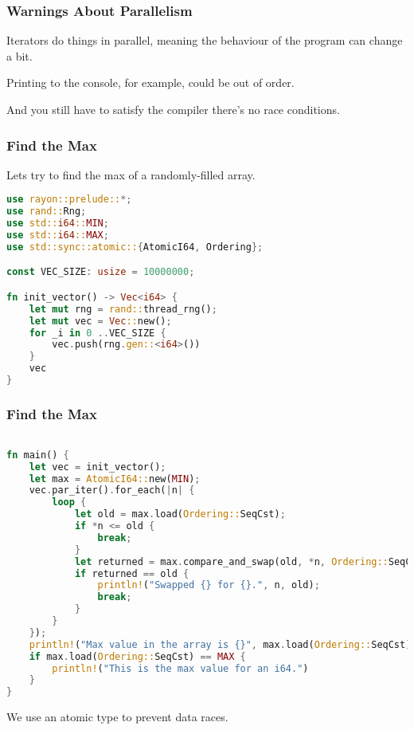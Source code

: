 \begin{frame}
\frametitle{Warnings About Parallelism}

Iterators do things in parallel, meaning the behaviour of the program can change a bit. 

Printing to the console, for example, could be out of order.

And you still have to satisfy the compiler there's no race conditions.

\end{frame}

\begin{frame}[fragile]
\frametitle{Find the Max}

Lets try to find the max of a randomly-filled array.

\begin{lstlisting}[language=Rust]
use rayon::prelude::*;
use rand::Rng;
use std::i64::MIN;
use std::i64::MAX;
use std::sync::atomic::{AtomicI64, Ordering};

const VEC_SIZE: usize = 10000000;

fn init_vector() -> Vec<i64> {
    let mut rng = rand::thread_rng();
    let mut vec = Vec::new();
    for _i in 0 ..VEC_SIZE {
        vec.push(rng.gen::<i64>())
    }
    vec
}

\end{lstlisting}
\end{frame}
\begin{frame}[fragile]
\frametitle{Find the Max}


\begin{lstlisting}[language=Rust]

fn main() {
    let vec = init_vector();
    let max = AtomicI64::new(MIN);
    vec.par_iter().for_each(|n| {
        loop {
            let old = max.load(Ordering::SeqCst);
            if *n <= old {
                break;
            }
            let returned = max.compare_and_swap(old, *n, Ordering::SeqCst);
            if returned == old {
                println!("Swapped {} for {}.", n, old);
                break;
            }
        }
    });
    println!("Max value in the array is {}", max.load(Ordering::SeqCst));
    if max.load(Ordering::SeqCst) == MAX {
        println!("This is the max value for an i64.")
    }
}
\end{lstlisting}

We use an atomic type to prevent data races.

\end{frame}


